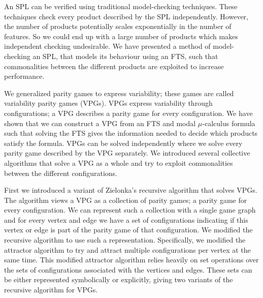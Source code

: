 An SPL can be verified using traditional model-checking techniques. These techniques check every product described by the SPL independently. However, the number of products potentially scales exponentially in the number of features. So we could end up with a large number of products which makes independent checking undesirable. We have presented a method of model-checking an SPL, that models its behaviour using an FTS, such that commonalities between the different products are exploited to increase performance.

We generalized parity games to express variability; these games are called variability parity games (VPGs). VPGs express variability through configurations; a VPG describes a parity game for every configuration. We have shown that we can construct a VPG from an FTS and modal $\mu$-calculus formula such that solving the FTS gives the information needed to decide which products satisfy the formula. VPGs can be solved independently where we solve every parity game described by the VPG separately. We introduced several collective algorithms that solve a VPG as a whole and try to exploit commonalities between the different configurations.

First we introduced a variant of Zielonka's recursive algorithm that solves VPGs. The algorithm views a VPG as a collection of parity games; a parity game for every configuration. We can represent such a collection with a single game graph and for every vertex and edge we have a set of configurations indicating if this vertex or edge is part of the parity game of that configuration. We modified the recursive algorithm to use such a representation. Specifically, we modified the attractor algorithm to try and attract multiple configurations per vertex at the same time. This modified attractor algorithm relies heavily on set operations over the sets of configurations associated with the vertices and edges. These sets can be either represented symbolically or explicitly, giving two variants of the recursive algorithm for VPGs.

